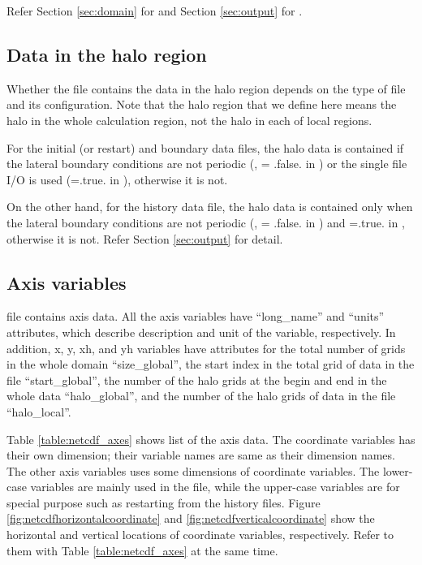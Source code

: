 \noindent Refer Section \ref{sec:domain} for  and
Section \ref{sec:output} for .


\subsection{Data in the halo region}

Whether the file 
contains the data in the halo region
depends on the type of file and its configuration.
Note that the halo region that we define here means the halo in the whole calculation region,
not the halo in each of local regions.

For the initial (or restart) and boundary data files, 
the halo data is contained if the lateral boundary conditions are not periodic 
(,  = .false. in ) 
or the single file I/O is used (=.true. in ),
otherwise it is not.

On the other hand,
for the history data file, 
the halo data is contained 
only when the lateral boundary conditions are not periodic
(,  = .false. in )
and =.true. in ,
otherwise it is not. Refer Section \ref{sec:output} for detail.

\subsection{Axis variables}
\scalenetcdf file contains axis data.
All the axis variables have 
``long\_name'' and ``units'' attributes,
which describe description and unit of the variable, respectively.
In addition, x, y, xh, and yh variables 
have attributes for the total number of grids in the whole domain ``size\_global'',
the start index in the total grid of data in the file ``start\_global'',
the number of the halo grids at the begin and end in the whole data ``halo\_global'',
and the number of the halo grids of data in the file ``halo\_local''.

Table \ref{table:netcdf_axes} shows list of the axis data.
The coordinate variables has their own dimension; their variable names are same as their dimension names.
The other axis variables uses some dimensions of coordinate variables.
The lower-case variables are mainly used in the file, 
while the upper-case variables are for special purpose such as restarting from the history files.
Figure \ref{fig:netcdfhorizontalcoordinate} and \ref{fig:netcdfverticalcoordinate} show 
the horizontal and vertical locations of coordinate variables,
respectively.
Refer to them with Table \ref{table:netcdf_axes} at the same time.

